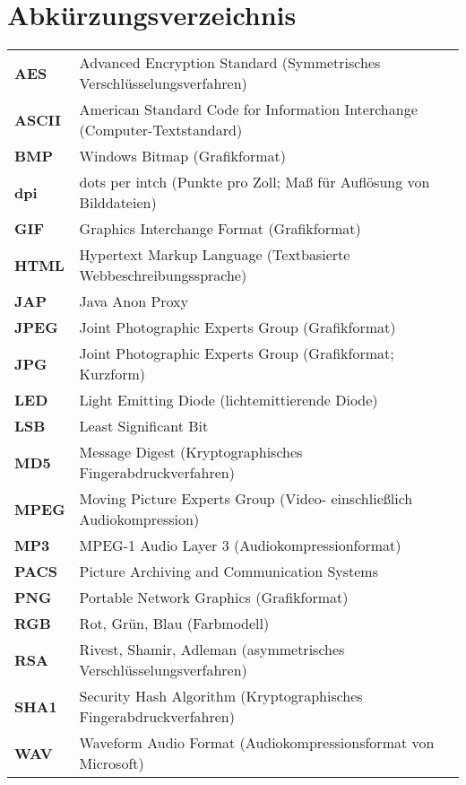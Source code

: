 {}
\chapter*{Abkürzungsverzeichnis}

\begin{center}
\begin{tabular}{ll}

\textbf{AES}	&	Advanced Encryption Standard (Symmetrisches Verschlüsselungsverfahren)\\
\textbf{ASCII}&	American Standard Code for Information Interchange (Computer-Textstandard)\\
\textbf{BMP}	&	Windows Bitmap (Grafikformat)\\
\textbf{dpi}	&	dots per intch (Punkte pro Zoll; Maß für Auflösung von Bilddateien)\\
\textbf{GIF}	&	Graphics Interchange Format (Grafikformat)\\
\textbf{HTML}	&	Hypertext Markup Language (Textbasierte Webbeschreibungssprache)\\
\textbf{JAP}	&	Java Anon Proxy\\
\textbf{JPEG}	&	Joint Photographic Experts Group (Grafikformat)\\
\textbf{JPG}	&	Joint Photographic Experts Group (Grafikformat; Kurzform)\\
\textbf{LED}	&	Light Emitting Diode (lichtemittierende Diode)\\
\textbf{LSB}	&	Least Significant Bit\\
\textbf{MD5}	& Message Digest (Kryptographisches Fingerabdruckverfahren)\\
\textbf{MPEG}	&	Moving Picture Experts Group (Video- einschließlich Audiokompression)\\
\textbf{MP3}	&	MPEG-1 Audio Layer 3 (Audiokompressionformat)\\
\textbf{PACS}	&	Picture Archiving and Communication Systems\\
\textbf{PNG}	&	Portable Network Graphics (Grafikformat)\\
\textbf{RGB}	&	Rot, Grün, Blau (Farbmodell)\\
\textbf{RSA}	&	Rivest, Shamir, Adleman (asymmetrisches Verschlüsselungsverfahren)\\
\textbf{SHA1}	&	Security Hash Algorithm (Kryptographisches Fingerabdruckverfahren)\\
\textbf{WAV}	&	Waveform Audio Format (Audiokompressionsformat von Microsoft)\\

\end{tabular}
\end{center}

